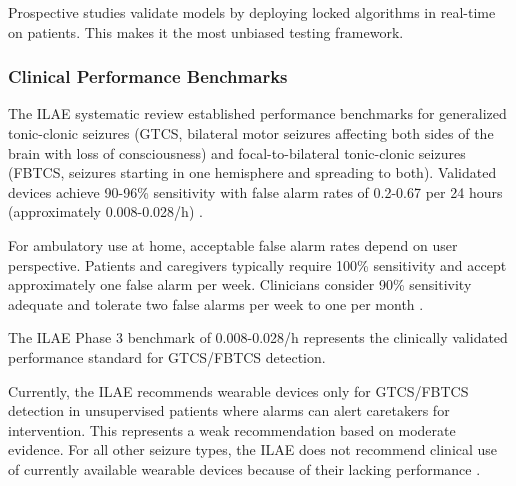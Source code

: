 Prospective studies validate models by deploying locked algorithms in real-time on patients. This makes it the most unbiased testing framework.

\subsubsection{Clinical Performance Benchmarks}

The ILAE systematic review established performance benchmarks for
generalized tonic-clonic seizures (GTCS, bilateral motor seizures affecting both sides of the brain with loss of consciousness)
and focal-to-bilateral tonic-clonic seizures (FBTCS, seizures starting in one hemisphere and spreading to both).
Validated devices achieve 90-96\% sensitivity with false alarm
rates of 0.2-0.67 per 24 hours (approximately 0.008-0.028/h)
\parencite{beniczkyAutomatedSeizureDetection2021}.

For ambulatory use at home, acceptable false alarm rates depend on user perspective.
Patients and caregivers typically require 100\% sensitivity
and accept approximately one false alarm per week.
Clinicians consider 90\% sensitivity adequate and tolerate
two false alarms per week to one per month \parencite{sivathambooPreferencesUserExperiences2022}.


The ILAE Phase 3 benchmark of 0.008-0.028/h represents the clinically validated performance standard for GTCS/FBTCS detection.

Currently, the ILAE recommends wearable devices only for GTCS/FBTCS
detection in unsupervised patients where alarms can alert caretakers for intervention.
This represents a weak recommendation based on moderate evidence.
For all other seizure types, the ILAE does not recommend clinical use
of currently available wearable devices because of their lacking performance
\parencite{beniczkyAutomatedSeizureDetection2021}.